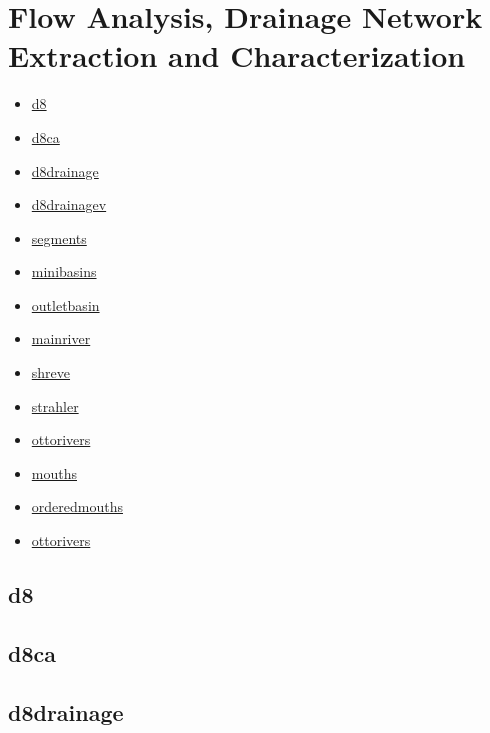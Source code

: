 \documentclass[
]{book}
\providecommand{\tightlist}{%
  \setlength{\itemsep}{0pt}\setlength{\parskip}{0pt}}
\theoremstyle{definition}
\theoremstyle{definition}
\theoremstyle{definition}
\theoremstyle{definition}
\theoremstyle{remark}
\begin{document}
\section{Flow Analysis, Drainage Network Extraction and Characterization}\label{Flow-Analysis-Drainage-Network-Extraction-and-Characterization}

\begin{itemize}
\tightlist
\item
  \hyperref[d8]{d8}\\
\item
  \hyperref[d8ca]{d8ca}\\
\item
  \hyperref[d8drainage]{d8drainage}\\
\item
  \hyperref[d8drainagev]{d8drainagev}\\
\item
  \hyperref[segments]{segments}\\
\item
  \hyperref[minibasins]{minibasins}\\
\item
  \hyperref[outletbasin]{outletbasin}\\
\item
  \hyperref[mainriver]{mainriver}\\
\item
  \hyperref[shreve]{shreve}\\
\item
  \hyperref[strahler]{strahler}\\
\item
  \hyperref[ottorivers]{ottorivers}\\
\item
  \hyperref[mouths]{mouths}\\
\item
  \hyperref[orderedmouths]{orderedmouths}
\item
  \hyperref[ottorivers]{ottorivers}
\end{itemize}

\subsection{d8}\label{d8}

\subsection{d8ca}\label{d8ca}

\subsection{d8drainage}\label{d8drainage}
\end{document}
